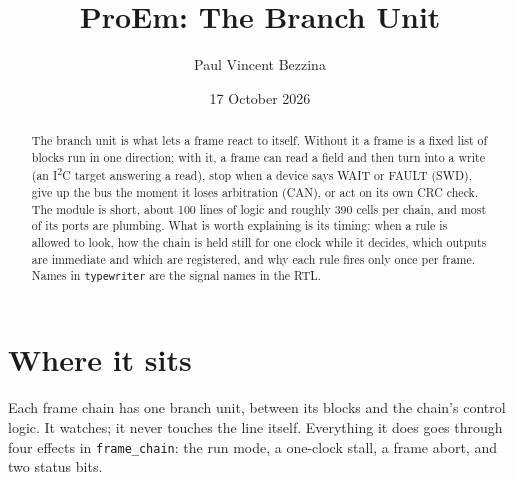 \documentclass[11pt,a4paper]{article}
\title{ProEm: The Branch Unit\\\large \sig{src/core/frame\_chain/branch\_unit.sv}}
\author{Paul Vincent Bezzina}
\date{17 October 2026}
\newcommand{\sig}[1]{\texttt{#1}}
\begin{document}
\maketitle
\thispagestyle{fancy}

\begin{abstract}
The branch unit is what lets a frame react to itself. Without it a frame is a fixed list of blocks run in one direction; with it, a frame can read a field and then turn into a write (an I\textsuperscript{2}C target answering a read), stop when a device says WAIT or FAULT (SWD), give up the bus the moment it loses arbitration (CAN), or act on its own CRC check. The module is short, about 100 lines of logic and roughly 390 cells per chain, and most of its ports are plumbing. What is worth explaining is its timing: when a rule is allowed to look, how the chain is held still for one clock while it decides, which outputs are immediate and which are registered, and why each rule fires only once per frame. Names in \sig{typewriter} are the signal names in the RTL.
\end{abstract}

\tableofcontents

\section{Where it sits}

Each frame chain has one branch unit, between its blocks and the chain's control logic. It watches; it never touches the line itself. Everything it does goes through four effects in \sig{frame\_chain}: the run mode, a one-clock stall, a frame abort, and two status bits.
\end{document}
